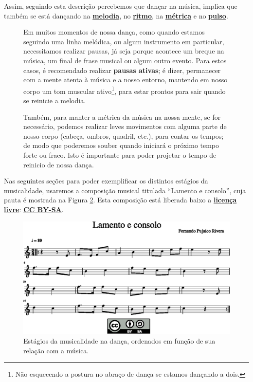 Assim, seguindo esta descrição percebemos que dançar na música, 
implica que também se está dançando na \hyperref[sec:pos:Melodia]{\textbf{melodia}}, 
no \hyperref[sec:pos:Ritmo]{\textbf{ritmo}}, 
na \hyperref[def:Metrica]{\textbf{métrica}} e 
no \hyperref[ref:Pulso]{\textbf{pulso}}.

\begin{figure}[!bh]
\begin{elaboracion}[title=Pausa ativa, width= 1.0\linewidth]
\label{ref:pausaativa}
Em muitos momentos de nossa dança, como quando estamos seguindo uma linha melódica,
ou algum instrumento em particular, necessitamos realizar pausas, 
já seja porque acontece um breque na música, um final de frase musical ou algum outro evento.
Para estos casos, é recomendado realizar \textbf{pausas ativas}; é dizer,
permanecer com a mente atenta à música e a nosso entorno, 
mantendo em nosso corpo um tom muscular ativo\footnote{Não 
esquecendo a postura no abraço de dança se estamos dançando a dois. }, 
para estar prontos para sair quando se reinicie a melodia.

Também, para manter a métrica da música na nossa mente,
se for necessário, 
podemos realizar leves movimentos com alguma parte de nosso corpo (cabeça, ombros, quadril, etc.),
para contar os tempos;  
de modo que poderemos souber quando iniciará o próximo tempo forte ou fraco.
Isto é importante para poder projetar o tempo de reinicio de nossa dança.
\end{elaboracion}
\end{figure}

Nas seguintes seções para poder exemplificar os distintos estágios da musicalidade,
usaremos a composição musical titulada ``Lamento e consolo'',
cuja pauta é mostrada na Figura \ref{fig:lamento-e-consolo}.
Esta composição está liberada baixo a 
\hyperref[ref:licensalivre]{\textbf{licença livre}}:
\hyperref[subsec:CCBYSA]{\textbf{CC BY-SA}}.


\begin{figure}
    \centering
    \includegraphics[width=\textwidth]{chapters/cap-musicalidade-tecnica/lamento-e-consolo-1.eps}
    \caption{Estágios da musicalidade na dança, ordenados em função de sua relação com a música.}
    \label{fig:lamento-e-consolo}
\end{figure}






